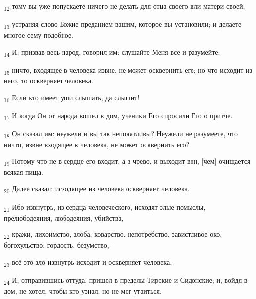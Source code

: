 \begin{tcolorbox}
\textsubscript{12} тому вы уже попускаете ничего не делать для отца своего или матери своей,
\end{tcolorbox}
\begin{tcolorbox}
\textsubscript{13} устраняя слово Божие преданием вашим, которое вы установили; и делаете многое сему подобное.
\end{tcolorbox}
\begin{tcolorbox}
\textsubscript{14} И, призвав весь народ, говорил им: слушайте Меня все и разумейте:
\end{tcolorbox}
\begin{tcolorbox}
\textsubscript{15} ничто, входящее в человека извне, не может осквернить его; но что исходит из него, то оскверняет человека.
\end{tcolorbox}
\begin{tcolorbox}
\textsubscript{16} Если кто имеет уши слышать, да слышит!
\end{tcolorbox}
\begin{tcolorbox}
\textsubscript{17} И когда Он от народа вошел в дом, ученики Его спросили Его о притче.
\end{tcolorbox}
\begin{tcolorbox}
\textsubscript{18} Он сказал им: неужели и вы так непонятливы? Неужели не разумеете, что ничто, извне входящее в человека, не может осквернить его?
\end{tcolorbox}
\begin{tcolorbox}
\textsubscript{19} Потому что не в сердце его входит, а в чрево, и выходит вон, [чем] очищается всякая пища.
\end{tcolorbox}
\begin{tcolorbox}
\textsubscript{20} Далее сказал: исходящее из человека оскверняет человека.
\end{tcolorbox}
\begin{tcolorbox}
\textsubscript{21} Ибо извнутрь, из сердца человеческого, исходят злые помыслы, прелюбодеяния, любодеяния, убийства,
\end{tcolorbox}
\begin{tcolorbox}
\textsubscript{22} кражи, лихоимство, злоба, коварство, непотребство, завистливое око, богохульство, гордость, безумство, --
\end{tcolorbox}
\begin{tcolorbox}
\textsubscript{23} всё это зло извнутрь исходит и оскверняет человека.
\end{tcolorbox}
\begin{tcolorbox}
\textsubscript{24} И, отправившись оттуда, пришел в пределы Тирские и Сидонские; и, войдя в дом, не хотел, чтобы кто узнал; но не мог утаиться.
\end{tcolorbox}
